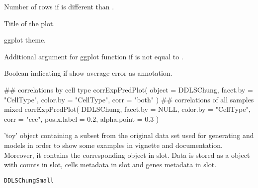 \documentclass[a4paper]{book}
\begin{document}
\begin{Arguments}
\begin{ldescription}
\item[\code{nrow}] Number of rows if  is different than .

\item[\code{title}] Title of the plot.

\item[\code{theme}] ggplot theme.

\item[\code{...}] Additional argument for  ggplot function if
 is not equal to .

\item[\code{error.labels}] Boolean indicating if show average error as annotation.
\end{ldescription}
\end{Arguments}
%
\begin{SeeAlso}\relax
{} 
 
\end{SeeAlso}
%
\begin{Examples}
\begin{ExampleCode}
## correlations by cell type
corrExpPredPlot(
  object = DDLSChung,
  facet.by = "CellType",
  color.by = "CellType",
  corr = "both"
)
## correlations of all samples mixed
corrExpPredPlot(
  DDLSChung,
  facet.by = NULL,
  color.by = "CellType",
  corr = "ccc",
  pos.x.label = 0.2,
  alpha.point = 0.3
)
\end{ExampleCode}
\end{Examples}
%
\begin{Description}\relax
{} 'toy' object containing a subset from the
original data set used for generating  and
 models in order to show some examples in
vignette and documentation. Moreover, it contains the corresponding
 object in  slot. Data is stored as a
 object with counts in  slot, cells
metadata in  slot and genes metadata in  slot.
\end{Description}
%
\begin{Usage}
\begin{verbatim}
DDLSChungSmall
\end{verbatim}
\end{Usage}
\end{document}
